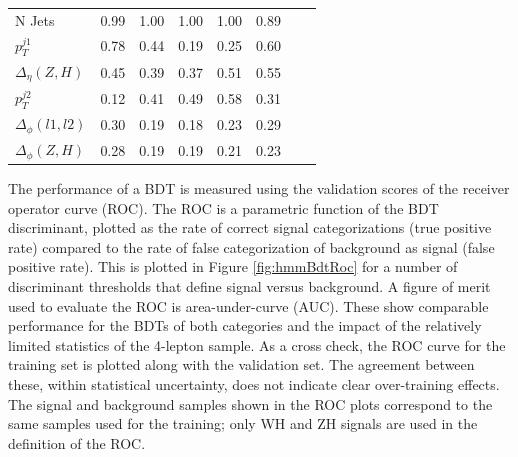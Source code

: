 {\begin{table}[htp]
\begin{center}
\begin{tabular}{l ccccccc}
N Jets & 0.99 & 1.00 & 1.00 & 1.00 & 0.89 \\
$p_T^{j1}$ & 0.78 & 0.44 & 0.19 & 0.25 & 0.60 \\
$\Delta_\eta(Z,H)$ & 0.45 & 0.39 & 0.37 & 0.51 & 0.55 \\
$p_T^{j2}$ & 0.12 & 0.41 & 0.49 & 0.58 & 0.31 \\
$\Delta_\phi(l1,l2)$ & 0.30 & 0.19 & 0.18 & 0.23 & 0.29 \\
$\Delta_\phi(Z,H)$ & 0.28 & 0.19 & 0.19 & 0.21 & 0.23 \\
\bottomrule
\end{tabular}
\label{tab:4lepVarImport}
\end{center}
\end{table}
\clearpage
}

The performance of a BDT is measured using the validation scores of the receiver operator curve (ROC).
The ROC is a parametric function of the BDT discriminant, plotted as the rate of correct signal categorizations (true positive rate) compared to the rate of false categorization of background as signal (false positive rate).
This is plotted in Figure \ref{fig:hmmBdtRoc} for a number of discriminant thresholds that define signal versus background.
A figure of merit used to evaluate the ROC is area-under-curve (AUC).
These show comparable performance for the BDTs of both categories and the impact of the relatively limited statistics of the 4-lepton sample.
As a cross check, the ROC curve for the training set is plotted along with the validation set. The agreement between these, within statistical uncertainty, does not indicate clear over-training effects.
The signal and background samples shown in the ROC plots correspond to the same samples used for the training; only WH and ZH signals are used in the definition of the ROC.

